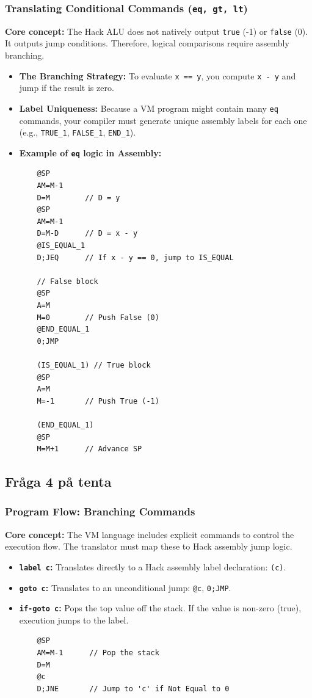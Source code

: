 \documentclass[12pt,a4paper]{article}
\begin{document}
\subsubsection*{Translating Conditional Commands (\texttt{eq, gt, lt})}
\textbf{Core concept:} The Hack ALU does not natively output \texttt{true} (-1) or \texttt{false} (0). It outputs jump conditions. Therefore, logical comparisons require assembly branching.
\begin{itemize}
    \item \textbf{The Branching Strategy:} To evaluate \texttt{x == y}, you compute \texttt{x - y} and jump if the result is zero.
    \item \textbf{Label Uniqueness:} Because a VM program might contain many \texttt{eq} commands, your compiler must generate unique assembly labels for each one (e.g., \texttt{TRUE\_1}, \texttt{FALSE\_1}, \texttt{END\_1}).
    \item \textbf{Example of \texttt{eq} logic in Assembly:}
    \begin{verbatim}
    @SP
    AM=M-1
    D=M        // D = y
    @SP
    AM=M-1
    D=M-D      // D = x - y
    @IS_EQUAL_1
    D;JEQ      // If x - y == 0, jump to IS_EQUAL
    
    // False block
    @SP
    A=M
    M=0        // Push False (0)
    @END_EQUAL_1
    0;JMP
    
    (IS_EQUAL_1) // True block
    @SP
    A=M
    M=-1       // Push True (-1)
    
    (END_EQUAL_1)
    @SP
    M=M+1      // Advance SP
    \end{verbatim}
\end{itemize}

\subsection{Fråga 4 på tenta}
\subsubsection*{Program Flow: Branching Commands}
\textbf{Core concept:} The VM language includes explicit commands to control the execution flow. The translator must map these to Hack assembly jump logic.
\begin{itemize}
    \item \textbf{\texttt{label c}:} Translates directly to a Hack assembly label declaration: \texttt{(c)}.
    \item \textbf{\texttt{goto c}:} Translates to an unconditional jump: \texttt{@c}, \texttt{0;JMP}.
    \item \textbf{\texttt{if-goto c}:} Pops the top value off the stack. If the value is non-zero (true), execution jumps to the label.
    \begin{verbatim}
    @SP
    AM=M-1      // Pop the stack
    D=M
    @c
    D;JNE       // Jump to 'c' if Not Equal to 0
    \end{verbatim}
\end{itemize}
\end{document}
